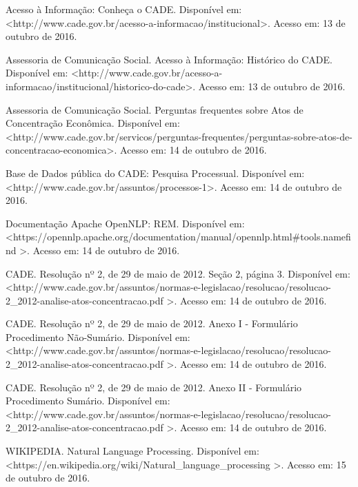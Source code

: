 \documentclass[11pt]{report}
\begin{document}
\begin{enumerate}[label={[\arabic*]}]
\item Acesso à Informação: Conheça o CADE. Disponível em: \textless\enspace http://www.cade.gov.br/acesso-a-informacao/institucional\enspace\textgreater. Acesso em: 13 de outubro de 2016.
\item Assessoria de Comunicação Social. Acesso à Informação: Histórico do CADE. Disponível em: \textless\enspace http://www.cade.gov.br/acesso-a-informacao/institucional/historico-do-cade\enspace\textgreater. Acesso em: 13 de outubro de 2016.
\item Assessoria de Comunicação Social. Perguntas frequentes sobre Atos de Concentração Econômica. Disponível em: \textless\enspace http://www.cade.gov.br/servicos/perguntas-frequentes/perguntas-sobre-atos-de-concentracao-economica\enspace\textgreater. Acesso em: 14 de outubro de 2016.
\item Base de Dados pública do CADE: Pesquisa Processual. Disponível em: \newline\textless\enspace http://www.cade.gov.br/assuntos/processos-1\enspace\textgreater. Acesso em: 14 de outubro de 2016.
\item Documentação Apache OpenNLP: REM. Disponível em: \newline\textless\enspace https://opennlp.apache.org/documentation/manual/opennlp.html\#tools.namefind \enspace\textgreater. Acesso em: 14 de outubro de 2016.
\item CADE. Resolução nº 2, de 29 de maio de 2012. Seção 2, página 3. Disponível em: \textless\enspace http://www.cade.gov.br/assuntos/normas-e-legislacao/resolucao/resolucao-2\_2012-analise-atos-concentracao.pdf \enspace\textgreater. Acesso em: 14 de outubro de 2016.
\item CADE. Resolução nº 2, de 29 de maio de 2012. Anexo I - Formulário Procedimento Não-Sumário. Disponível em: \newline\textless\enspace http://www.cade.gov.br/assuntos/normas-e-legislacao/resolucao/resolucao-2\_2012-analise-atos-concentracao.pdf \enspace\textgreater. Acesso em: 14 de outubro de 2016.
\item CADE. Resolução nº 2, de 29 de maio de 2012. Anexo II - Formulário Procedimento Sumário. Disponível em: \newline\textless\enspace http://www.cade.gov.br/assuntos/normas-e-legislacao/resolucao/resolucao-2\_2012-analise-atos-concentracao.pdf \enspace\textgreater. Acesso em: 14 de outubro de 2016.
\item WIKIPEDIA. Natural Language Processing. Disponível em: \newline\textless\enspace https://en.wikipedia.org/wiki/Natural\_language\_processing \enspace\textgreater. Acesso em: 15 de outubro de 2016.

\end{enumerate}
\end{document}
